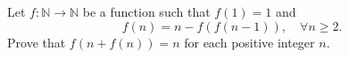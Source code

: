 Let $f: \mathbb N \to \mathbb N$ be a function such that $f(1)=1$ and
\[f(n)=n - f(f(n-1)), \quad \forall n \geq 2.\]Prove that $f(n+f(n))=n $ for each positive integer $n.$